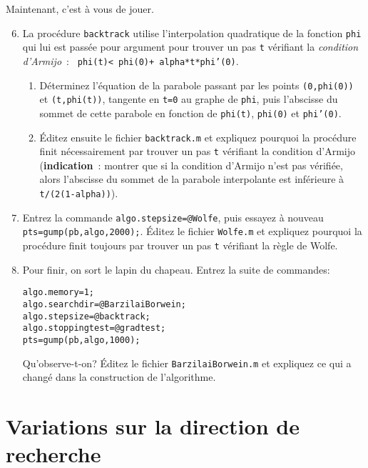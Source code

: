 \documentclass[10pt,a4paper,fleqn]{report}
\newcommand{\onit}{\begin{enumerate}}
\newcommand{\offit}{\end{enumerate}}
\renewcommand{\tt}{\texttt}
\begin{document}
\bigskip

Maintenant, c'est \`a vous de jouer.

\bigskip

\onit \setcounter{enumi}{5}
\item La proc\'edure \tt{backtrack} utilise l'interpolation quadratique de la fonction \tt{phi}  qui lui est pass\'ee pour argument pour trouver un pas \tt t v\'erifiant la \textit{condition d'Armijo}~:
\tt{ phi(t)< phi(0)+ alpha*t*phi'(0)}.
\onit
\item D\'eterminez l'\'equation de la parabole passant par les points \tt{(0,phi(0))} et \texttt{(t,phi(t))}, tangente en \tt{t=0} au graphe de \tt{phi}, puis l'abscisse du sommet de cette parabole en fonction de \tt{phi(t)}, \tt{phi(0)} et \tt{phi'(0)}.
\item \'Editez ensuite le fichier \tt{backtrack.m} et expliquez
  pourquoi la proc\'edure finit n\'ecessairement par trouver un pas
  \tt t v\'erifiant la condition d'Armijo (\textbf{indication}~:
  montrer que si la condition d'Armijo n'est pas vérifiée, alors
  l'abscisse du sommet de la parabole interpolante est inf\'erieure
  \`a \tt{t/(2(1-alpha))}).  \offit

\item Entrez la commande \tt{algo.stepsize=@Wolfe}, puis essayez \`a nouveau  \tt{pts=gump(pb,algo,2000);}. \'Editez le fichier \texttt{Wolfe.m} et expliquez pourquoi la proc\'edure finit toujours par trouver un pas \tt t v\'erifiant la r\`egle de Wolfe.

\item Pour finir, on sort le lapin du chapeau. Entrez la suite de commandes:

\hfill\parbox[t]{0.9 \textwidth}{
\tt{algo.memory=1;}\\
\tt{algo.searchdir=@BarzilaiBorwein;}\\
\tt{algo.stepsize=@backtrack;}\\
\tt{algo.stoppingtest=@gradtest;}\\
\tt{pts=gump(pb,algo,1000);}
}
\medskip

Qu'observe-t-on? \'Editez le fichier \tt{BarzilaiBorwein.m} et expliquez ce qui a chang\'e dans la construction de l'algorithme.
\offit

\bigskip

\section{Variations sur la direction de recherche}
\end{document}
